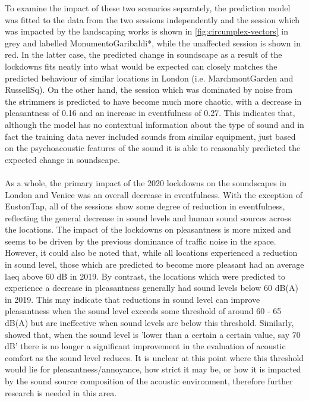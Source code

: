    To examine the impact of these two scenarios separately, the prediction model was fitted to the data from the two sessions independently and the session which was impacted by the landscaping works is shown in \cref{fig:circumplex-vectors} in grey and labelled MonumentoGaribaldi*, while the unaffected session is shown in red. In the latter case, the predicted change in soundscape as a result of the lockdowns fits neatly into what would be expected can closely matches the predicted behaviour of similar locations in London (i.e. MarchmontGarden and RussellSq). On the other hand, the session which was dominated by noise from the strimmers is predicted to have become much more chaotic, with a decrease in pleasantness of 0.16 and an increase in eventfulness of 0.27. This indicates that, although the model has no contextual information about the type of sound and in fact the training data never included sounds from similar equipment, just based on the psychoacoustic features of the sound it is able to reasonably predicted the expected change in soundscape.

   \paragraph*{}As a whole, the primary impact of the 2020 lockdowns on the soundscapes in London and Venice was an overall decrease in eventfulness. With the exception of EustonTap, all of the sessions show some degree of reduction in eventfulness, reflecting the general decrease in sound levels and human sound sources across the locations. The impact of the lockdowns on pleasantness is more mixed and seems to be driven by the previous dominance of traffic noise in the space. However, it could also be noted that, while all locations experienced a reduction in sound level, those which are predicted to become more pleasant had an average \gls{laeq} above 60 dB in 2019. By contrast, the locations which were predicted to experience a decrease in pleasantness generally had sound levels below 60 dB(A) in 2019. This may indicate that reductions in sound level can improve pleasantness when the sound level exceeds some threshold of around 60 - 65 dB(A) but are ineffective when sound levels are below this threshold. Similarly, \citet{Yang2005Acoustic} showed that, when the sound level is 'lower than a certain a certain value, say 70 dB' there is no longer a significant improvement in the evaluation of acoustic comfort as the sound level reduces. It is unclear at this point where this threshold would lie for pleasantness/annoyance, how strict it may be, or how it is impacted by the sound source composition of the acoustic environment, therefore further research is needed in this area.

